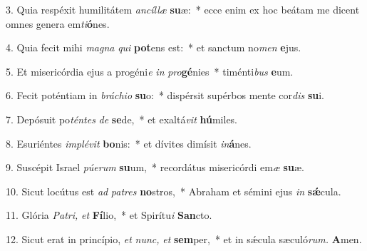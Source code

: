\item 3. Quia respéxit humilitátem \textit{ancíllæ} \textbf{su}æ:~* ecce enim ex hoc beátam me dicent omnes genera em\textit{ti}\textbf{ó}nes.

\item 4. Quia fecit mihi \textit{magna} \textit{qui} \textbf{pot}ens est:~* et sanctum no\textit{men} \textbf{e}jus.

\item 5. Et misericórdia ejus a progéni\textit{e} \textit{in} \textit{pro}\textbf{gé}nies~* timénti\textit{bus} \textbf{e}um.

\item 6. Fecit poténtiam in \textit{bráchio} \textbf{su}o:~* dispérsit supérbos mente cor\textit{dis} \textbf{su}i.

\item 7. Depósuit po\textit{téntes} \textit{de} \textbf{se}de,~* et exaltá\textit{vit} \textbf{hú}miles.

\item 8. Esuriéntes \textit{implévit} \textbf{bo}nis:~* et dívites dimísit \textit{in}\textbf{á}nes.

\item 9. Suscépit Israel \textit{púerum} \textbf{su}um,~* recordátus misericórdi em\textit{æ} \textbf{su}æ.

\item 10. Sicut locútus est \textit{ad} \textit{patres} \textbf{no}stros,~* Abraham et sémini ejus \textit{in} \textbf{sǽ}cula.

\item 11. Glória \textit{Patri,} \textit{et} \textbf{Fí}lio,~* et Spirítu\hspace{0.03em}\textit{i} \textbf{San}cto.

\item 12. Sicut erat in princípio, \textit{et} \textit{nunc,} \textit{et} \textbf{sem}per,~* et in sǽcula sæculó\textit{rum.} \textbf{A}men.